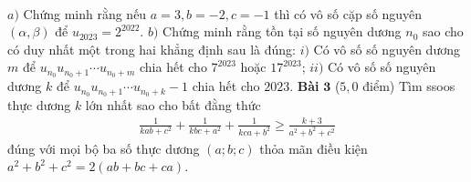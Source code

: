 \begin{multicols}{2}
\begin{align*}
	\end{align*}
	$a)$ Chứng minh rằng nếu $a=3, b = -2, c=-1$ thì có vô số cặp số nguyên $\left(\alpha, \beta\right)$ để $u_{2023} = 2^{2022}$.
	\vskip 0.1cm
	$b)$ Chứng minh rằng tồn tại số nguyên dương $n_0$ sao cho có duy nhất một trong hai khẳng định sau là đúng:
	\vskip 0.1cm
	$i)$ Có vô số số nguyên dương $m$ để $u_{n_0}u_{n_0+1}\cdots u_{n_0 + m}$ chia hết cho $7^{2023}$  hoặc $17^{2023}$;
	$ii)$ Có vô số số nguyên dương $k$ để $u_{n_0}u_{n_0+1}\cdots u_{n_0 +k} -1$ chia hết cho $2023$.
	\vskip 0.1cm
	\textbf{Bài} $\pmb{3}$ ($5{,}0$ điểm) Tìm ssoos thực dương $k$ lớn nhất sao cho bất đằng thức 
	\begin{align*}
		\frac{1}{kab + c^2} + \frac{1}{kbc + a^2} + \frac{1}{kca + b^2 } \ge \frac{k+3}{a^2 + b^2 + c^2}
	\end{align*}
	đúng với mọi bộ ba số thực dương $(a;b;c)$ thỏa mãn điều kiện $a^2 + b^2 + c^2 = 2 (ab+ bc + ca)$.
\end{multicols}
%
